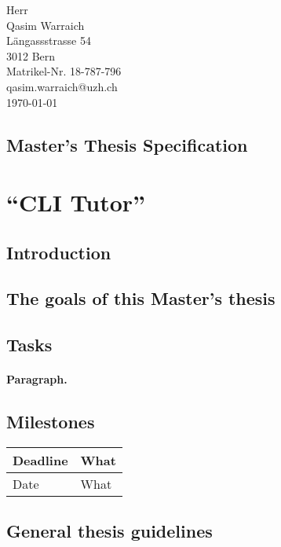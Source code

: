 \documentclass{task_description}
\begin{document}
\thispagestyle{firstpage}
\vspace*{23mm}%
\hfill\parbox[t]{65mm}{
Herr\\
Qasim Warraich\\
Längassstrasse 54\\
3012 Bern \\[3mm]
Matrikel-Nr. 18-787-796 \\
qasim.warraich@uzh.ch\\[15mm]
\today \\
}
\vspace*{5mm}

\subsection*{Master's Thesis Specification}

\section*{``CLI Tutor''}

\subsection*{Introduction}

\subsection*{The goals of this Master's thesis}

\subsection*{Tasks}
\paragraph{Paragraph.}

\subsection*{Milestones}

\begin{tabular}{lp{10cm}}
Deadline & What \\
\hline\noalign{\smallskip}
Date  & What \\
\end{tabular}

\subsection*{General thesis guidelines}
\end{document}
